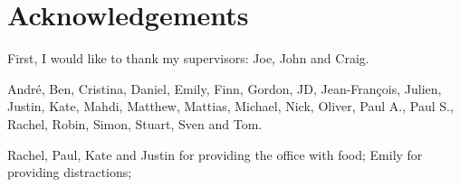 \chapter*{Acknowledgements}
\graphicspath{{Figures/Common/}}









First, I would like to thank my supervisors: Joe, John and Craig.

André, Ben, Cristina, Daniel, Emily, Finn, Gordon, JD, Jean-François, Julien, Justin, Kate, Mahdi, Matthew, Mattias, Michael, Nick, Oliver, Paul A., Paul S., Rachel, Robin, Simon, Stuart, Sven and Tom.

Rachel, Paul, Kate and Justin for providing the office with food; Emily for providing distractions; 